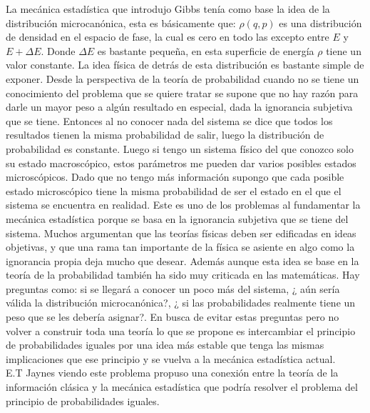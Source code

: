 La mecánica estadística que introdujo Gibbs tenía como base la idea de la distribución microcanónica, esta es básicamente que: $\rho(q,p)$ es una distribución de densidad en el espacio de fase, la cual es cero en todo las excepto entre $E$ y $E+ \Delta E$. Donde $\Delta E$ es bastante pequeña, en esta superficie de energía $\rho$ tiene un valor constante. La idea física de detrás de esta distribución es bastante simple de exponer. Desde la perspectiva de la teoría de probabilidad cuando no se tiene un conocimiento del problema que se quiere tratar se supone que no hay razón para darle un mayor peso a algún resultado en especial, dada la ignorancia subjetiva que se tiene. Entonces al no conocer nada del sistema se dice que todos los resultados tienen la misma probabilidad de salir, luego la distribución de probabilidad es constante. Luego si tengo un sistema físico del que conozco solo su estado macroscópico, estos parámetros me pueden dar varios posibles estados microscópicos. Dado que no tengo más información supongo que cada posible estado microscópico tiene la misma probabilidad de ser el estado en el que el sistema se encuentra en realidad. Este es uno de los problemas al fundamentar la mecánica estadística porque se basa en la ignorancia subjetiva que se tiene del sistema. Muchos argumentan que las teorías físicas deben ser edificadas en ideas objetivas, y que una rama tan importante de la física se asiente en algo como la ignorancia propia deja mucho que desear. Además aunque esta idea se base en la teoría de la probabilidad también ha sido muy criticada en las matemáticas. Hay preguntas como: si se llegará a conocer un poco más del sistema, ¿ aún sería válida la distribución microcanónica?, ¿ si las probabilidades realmente tiene un peso que se les debería asignar?. En busca de evitar estas preguntas pero no volver a construir toda una teoría lo que se propone es intercambiar el principio de probabilidades iguales por una idea más estable que tenga las mismas implicaciones que ese principio y se vuelva a la mecánica estadística actual.
\\
E.T Jaynes viendo este problema propuso una conexión entre la teoría de la información clásica y la mecánica estadística que podría resolver el problema del principio de probabilidades iguales. 






